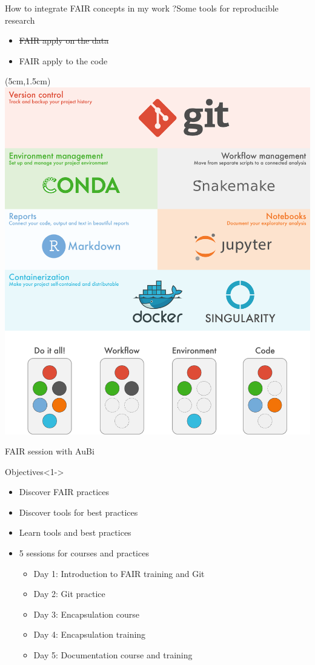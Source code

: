 \begin{frame}{How to integrate FAIR concepts in my work ?}{Some tools for reproducible research}
\begin{itemize}
\item {\sout{\color{gray} FAIR apply on the data}}
\item FAIR apply to the code
\end{itemize}
\begin{textblock*}{15cm}(5cm,1.5cm) %
\includegraphics[scale=0.3]{images/tutorials_overview.png}
\end{textblock*}
\end{frame}

\begin{frame}{FAIR session with AuBi}
\begin{block}{Objectives}<1->
\begin{itemize}
\item Discover FAIR practices
\item Discover tools for best practices
\item Learn tools and best practices
\item<2-> 5 sessions for courses and practices
	\begin{itemize}[<2->]
	\item Day 1: Introduction to FAIR training and Git
	\item Day 2: Git practice
	\item Day 3: Encapsulation course
	\item Day 4: Encapsulation training
	\item Day 5: Documentation course and training
	\end{itemize}
\end{itemize}
\end{block}
\end{frame}

